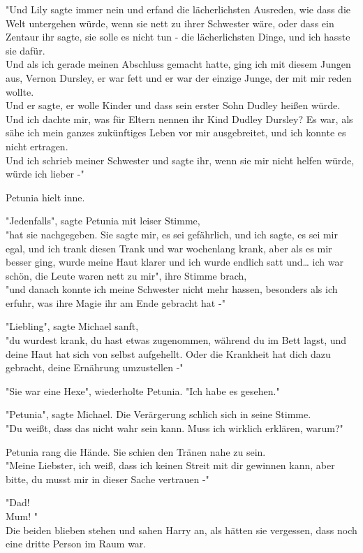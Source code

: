 {"Und Lily sagte immer nein und erfand die lächerlichsten Ausreden, wie dass die Welt untergehen würde, wenn sie nett zu ihrer Schwester wäre, oder dass ein Zentaur ihr sagte, sie solle es nicht tun - die lächerlichsten Dinge, und ich hasste sie dafür.\\ Und als ich gerade meinen Abschluss gemacht hatte, ging ich mit diesem Jungen aus, Vernon Dursley, er war fett und er war der einzige Junge, der mit mir reden wollte.\\ Und er sagte, er wolle Kinder und dass sein erster Sohn Dudley heißen würde. Und ich dachte mir, was für Eltern nennen ihr Kind Dudley Dursley? Es war, als sähe ich mein ganzes zukünftiges Leben vor mir ausgebreitet, und ich konnte es nicht ertragen.\\ Und ich schrieb meiner Schwester und sagte ihr, wenn sie mir nicht helfen würde, würde ich lieber -"

Petunia hielt inne.

"Jedenfalls", sagte Petunia mit leiser Stimme,\\ "hat sie nachgegeben. Sie sagte mir, es sei gefährlich, und ich sagte, es sei mir egal, und ich trank diesen Trank und war wochenlang krank, aber als es mir besser ging, wurde meine Haut klarer und ich wurde endlich satt und… ich war schön, die Leute waren nett zu mir", ihre Stimme brach,\\ "und danach konnte ich meine Schwester nicht mehr hassen, besonders als ich erfuhr, was ihre Magie ihr am Ende gebracht hat -"

"Liebling", sagte Michael sanft,\\ "du wurdest krank, du hast etwas zugenommen, während du im Bett lagst, und deine Haut hat sich von selbst aufgehellt. Oder die Krankheit hat dich dazu gebracht, deine Ernährung umzustellen -"

"Sie war eine Hexe", wiederholte Petunia. "Ich habe es gesehen."

"Petunia", sagte Michael. Die Verärgerung schlich sich in seine Stimme.\\ "Du weißt, dass das nicht wahr sein kann. Muss ich wirklich erklären, warum?"

Petunia rang die Hände. Sie schien den Tränen nahe zu sein.\\ "Meine Liebster, ich weiß, dass ich keinen Streit mit dir gewinnen kann, aber bitte, du musst mir in dieser Sache vertrauen -"

"Dad!\\ Mum! "\\ Die beiden blieben stehen und sahen Harry an, als hätten sie vergessen, dass noch eine dritte Person im Raum war.

}
